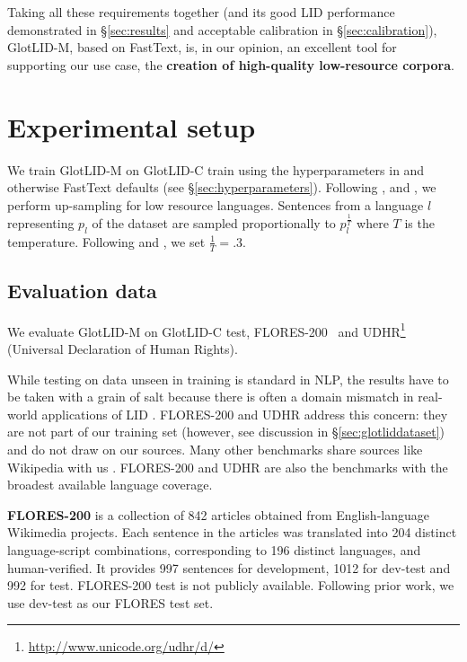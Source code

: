 \documentclass[11pt]{article}
\def\modelname{\mbox{GlotLID-M}\xspace}
\def\corpusname{\mbox{GlotLID-C}\xspace}
\def\flores{FLORES\xspace}
\def\udhr{UDHR\xspace}
\def\seclabel#1{\label{sec:#1}\label{p:#1}}
\def\secref#1{\S\ref{sec:#1}}
\begin{document}
Taking all these requirements together (and its good LID performance demonstrated in \secref{results} and acceptable calibration in \secref{calibration}), \modelname, based on FastText, is, in our opinion, an excellent tool for supporting our use case, the \textbf{creation of high-quality low-resource corpora}.


\section{Experimental setup}
We train \modelname on \corpusname train
using the hyperparameters
in \citep{nllbteam2022language, burchell-etal-2023-open} and
otherwise FastText defaults (see
\secref{hyperparameters}).
Following \citet{arivazhagan2019massively}, \citet{nllbteam2022language}
and \citet{burchell-etal-2023-open}, we perform up-sampling
for low resource languages.  Sentences from a language $l$
representing $p_l$ of the dataset are sampled
proportionally to $p_l^{\frac{1}{T}}$ where $T$ is the
temperature.  Following \citet{nllbteam2022language}
and \citet{burchell-etal-2023-open}, we set
$\frac{1}{T}=.3$.




\subsection{Evaluation data}\seclabel{evaluation_data}

We evaluate \modelname on \corpusname test,
\flores-200~\cite{nllbteam2022language} and
\udhr\footnote{\url{http://www.unicode.org/udhr/d/}} (Universal
Declaration of Human Rights).

While testing on  data unseen in training is standard in NLP,
the results have to be taken with a grain of salt because there is often
a domain mismatch in real-world applications of LID
\citep{caswell-etal-2020-language, dunn2020mapping}.
\flores-200 and \udhr 
address this concern: they are not part of our training set
(however, see discussion in \secref{glotliddataset})
and do not draw on our sources. Many other
benchmarks share sources like Wikipedia with us
\citep{thoma2018wili, haas-derczynski-2021-discriminating,
ahmadi-etal-2023-pali}. 
\flores-200 and \udhr  are also the benchmarks
with the broadest available language coverage.


\textbf{\flores-200}
is a collection of 842 articles
obtained from English-language Wikimedia projects. Each
sentence in the articles was translated into 
204 distinct language-script combinations, corresponding to
196 distinct languages,
and
human-verified. It
provides 997 sentences for development, 1012  for
dev-test and 992 for  test. \flores-200 test is not
publicly available.
Following prior work,
we use
dev-test as our \flores test set.
\end{document}
